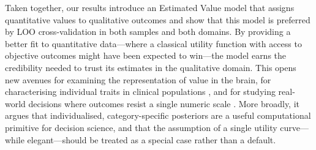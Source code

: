 \documentclass[11pt]{article}
\begin{document}
Taken together, our results introduce an Estimated Value model that assigns quantitative values to qualitative outcomes and show that this model is preferred by LOO cross-validation in both samples and both domains. By providing a better fit to quantitative data---where a classical utility function with access to objective outcomes might have been expected to win---the model earns the credibility needed to trust its estimates in the qualitative domain. This opens new avenues for examining the representation of value in the brain, for characterising individual traits in clinical populations \citep{ruderman2016ptsd,voon2015bed}, and for studying real-world decisions where outcomes resist a single numeric scale \citep{yeh2015dense,james2017prostate,basu2018vio}. More broadly, it argues that individualised, category-specific posteriors are a useful computational primitive for decision science, and that the assumption of a single utility curve---while elegant---should be treated as a special case rather than a default.


\end{document}
